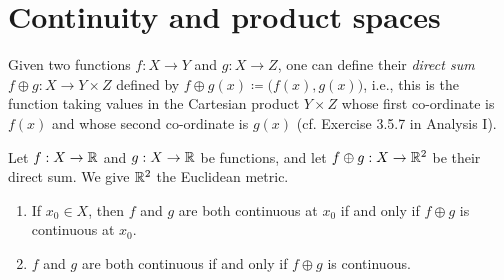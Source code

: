 \section{Continuity and product spaces}\label{sec:2.2}

\begin{note}
  Given two functions \(f : X \to Y\) and \(g : X \to Z\), one can define their \emph{direct sum} \(f \oplus g : X \to Y \times Z\) defined by \(f \oplus g(x) \coloneqq \big(f(x), g(x)\big)\), i.e., this is the function taking values in the Cartesian product \(Y \times Z\) whose first co-ordinate is \(f(x)\) and whose second co-ordinate is \(g(x)\)
  (cf. Exercise 3.5.7 in Analysis I).
\end{note}

\begin{lem}\label{2.2.1}
  Let \(f : X \to \mathbb{R}\) and \(g : X \to \mathbb{R}\) be functions, and let \(f \oplus g : X \to \mathbb{R}^2\) be their direct sum.
  We give \(\mathbb{R}^2\) the Euclidean metric.
  \begin{enumerate}
    \item If \(x_0 \in X\), then \(f\) and \(g\) are both continuous at \(x_0\) if and only if \(f \oplus g\) is continuous at \(x_0\).
    \item \(f\) and \(g\) are both continuous if and only if \(f \oplus g\) is continuous.
  \end{enumerate}
\end{lem}

